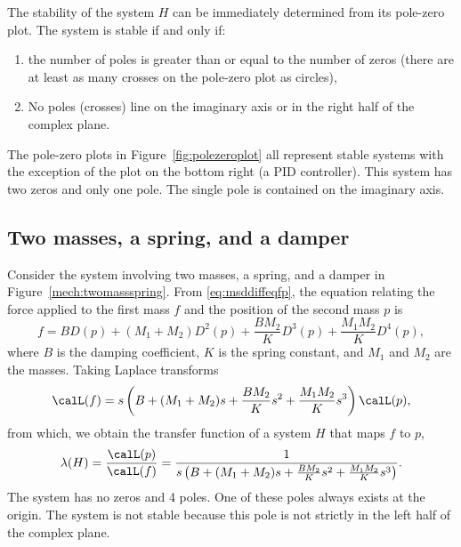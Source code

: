 The stability of the system $H$ can be immediately determined from its pole-zero plot.  The system is stable if and only if: 
\begin{enumerate}
\item the number of poles is greater than or equal to the number of zeros (there are at least as many crosses on the pole-zero plot as circles), 
\item No poles (crosses) line on the imaginary axis or in the right half of the complex plane.
\end{enumerate}
The pole-zero plots in Figure~\ref{fig:polezeroplot} all represent stable systems with the exception of the plot on the bottom right (a PID controller).  This system has two zeros and only one pole.  The single pole is contained on the imaginary axis.  %


\subsection{Two masses, a spring, and a damper}

Consider the system involving two masses, a spring, and a damper in Figure~\ref{mech:twomassspring}.  From \eqref{eq:msddiffeqfp}, the equation relating the force applied to the first mass $f$ and the position of the second mass $p$ is
\[
f = B D(p) + (M_1+M_2) D^2(p) + \frac{B M_2}{K} D^3(p) + \frac{M_1 M_2}{K} D^4(p),
\]
where $B$ is the damping coefficient, $K$ is the spring constant, and $M_1$ and $M_2$ are the masses.  Taking Laplace transforms
\[
\calL(f) = s \left(B + (M_1+M_2) s + \frac{B M_2}{K} s^2 + \frac{M_1 M_2}{K} s^3 \right) \calL(p),
\]
from which, we obtain the transfer function of a system $H$ that maps $f$ to $p$,
\[
\lambda(H) = \frac{\calL(p)}{\calL(f)} = \frac{1}{s \left(B + (M_1+M_2) s + \frac{B M_2}{K} s^2 + \frac{M_1 M_2}{K} s^3 \right)}.
\]
The system has no zeros and 4 poles.  One of these poles always exists at the origin.  The system is not stable because this pole is not strictly in the left half of the complex plane.

